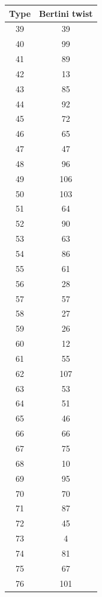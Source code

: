 \documentclass[a4paper, 11pt, reqno]{amsart}
\numberwithin{equation}{section} \numberwithin{figure}{section}
\theoremstyle{definition}
\numberwithin{lemma}{section}
\begin{document}
\begin{table}[ht]
\begin{minipage}{0.32\textwidth}
\begin{tabular}{|c|c|}
\hline
        \end{tabular}
    \end{minipage}
    \begin{minipage}{0.32\textwidth}
        \begin{tabular}{|c|c|}
        \hline
Type & Bertini twist\\
\hline
        39 & 39 \\
40 & 99 \\
41 & 89 \\
42 & 13 \\
43 & 85 \\
44 & 92 \\
45 & 72 \\
46 & 65 \\
47 & 47 \\
48 & 96 \\
49 & 106 \\
50 & 103 \\
51 & 64 \\
52 & 90 \\
53 & 63 \\
54 & 86 \\
55 & 61 \\
56 & 28 \\
57 & 57 \\
58 & 27 \\
59 & 26 \\
60 & 12 \\
61 & 55 \\
62 & 107 \\
63 & 53 \\
64 & 51 \\
65 & 46 \\
66 & 66 \\
67 & 75 \\
68 & 10 \\
69 & 95 \\
70 & 70 \\
71 & 87 \\
72 & 45 \\
73 & 4 \\
74 & 81 \\
75 & 67 \\
76 & 101\\
\hline
        \end{tabular}
    \end{minipage}
    \begin{minipage}{0.32\textwidth}
        \begin{tabular}{|c|c|}
        \hline

\end{tabular}
\end{minipage}
\end{table}
\end{document}
